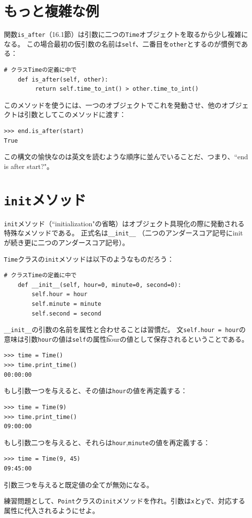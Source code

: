 \documentclass[a4j,12pt,makeidx]{jbook}
\begin{document}
\section{もっと複雑な例}
関数{\tt is\_after}（16.1節）は引数に二つの{\tt Time}オブジェクトを取るから少し複雑になる。
この場合最初の仮引数の名前は{\tt self}、二番目を{\tt other}とするのが慣例である：
\begin{verbatim}
# クラスTimeの定義に中で
    def is_after(self, other):
         return self.time_to_int() > other.time_to_int()
\end{verbatim}
このメソッドを使うには、一つのオブジェクトでこれを発動させ、他のオブジェクトは引数としてこのメソッドに渡す：
\begin{verbatim}
>>> end.is_after(start)
True
\end{verbatim}
この構文の愉快なのは英文を読むような順序に並んでいることだ、つまり、``end is after start?"。
%
\section{{\tt init}メソッド}
{\tt init}メソッド（``initialization"の省略）はオブジェクト具現化の際に発動される特殊なメソッドである。
正式名は{\verb"__init__"} （二つのアンダースコア記号にinitが続き更に二つのアンダースコア記号）。\par
{\tt Time}クラスの{\tt init}メソッドは以下のようなものだろう：
\begin{verbatim}
# クラスTimeの定義に中で
    def __init__(self, hour=0, minute=0, second=0):
        self.hour = hour
        self.minute = minute
        self.second = second
\end{verbatim}
{\verb"__init__"}の引数の名前を属性と合わせることは習慣だ。
文{\tt self.hour = hour}の意味は引数{\tt hour}の値は{\tt self}の属性{\t hour}の値として保存されるということである。
\begin{verbatim}
>>> time = Time()
>>> time.print_time()
00:00:00
\end{verbatim}
もし引数一つを与えると、その値は{\tt hour}の値を再定義する：
\begin{verbatim}
>>> time = Time(9)
>>> time.print_time()
09:00:00
\end{verbatim}
もし引数二つを与えると、それらは{\tt hour},{\tt  minute}の値を再定義する：
\begin{verbatim}
>>> time = Time(9, 45)
09:45:00
\end{verbatim}
引数三つを与えると既定値の全てが無効になる。\par
練習問題として、{\tt Point}クラスの{\tt init}メソッドを作れ。引数は{\tt x}と{\tt y}で、対応する属性に代入されるようにせよ。
%
\end{document}
